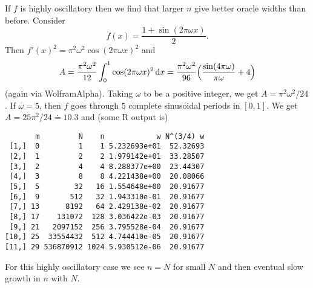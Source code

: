 \documentclass{article}
\newcommand{\rd}{\,\mathrm{d}}
\begin{document}
If $f$ is highly oscillatory then we find that larger $n$
give better oracle widths than before.  Consider
$$
f(x) = \frac{1+\sin(2\pi\omega x)}2.
$$
Then $f'(x)^2=\pi^2\omega^2\cos(2\pi\omega x)^2$ and 
$$
A = \frac{\pi^2\omega^2}{12}\int_0^1\cos(2\pi\omega x)^2\rd x
= \frac{\pi^2\omega^2}{96}\Bigl( \frac{\sin(4\pi\omega)}{\pi\omega}+4\Bigr)
$$
(again via WolframAlpha). Taking $\omega$ to be a positive integer, we get
$A=\pi^2\omega^2/24$.
If $\omega =5$, then $f$ goes through $5$ complete sinusoidal periods
in $[0,1]$. We get $A=25\pi^2/24\doteq10.3$ and (some R output is)
\begin{verbatim}
       m         N    n            w N^(3/4) w
 [1,]  0         1    1 5.232693e+01  52.32693
 [2,]  1         2    2 1.979142e+01  33.28507
 [3,]  2         4    4 8.288377e+00  23.44307
 [4,]  3         8    8 4.221438e+00  20.08066
 [5,]  5        32   16 1.554648e+00  20.91677
 [6,]  9       512   32 1.943310e-01  20.91677
 [7,] 13      8192   64 2.429138e-02  20.91677
 [8,] 17    131072  128 3.036422e-03  20.91677
 [9,] 21   2097152  256 3.795528e-04  20.91677
[10,] 25  33554432  512 4.744410e-05  20.91677
[11,] 29 536870912 1024 5.930512e-06  20.91677
\end{verbatim} 
For this highly oscillatory case we see $n=N$ for small $N$ and
then eventual slow growth in $n$ with $N$.




\end{document}
